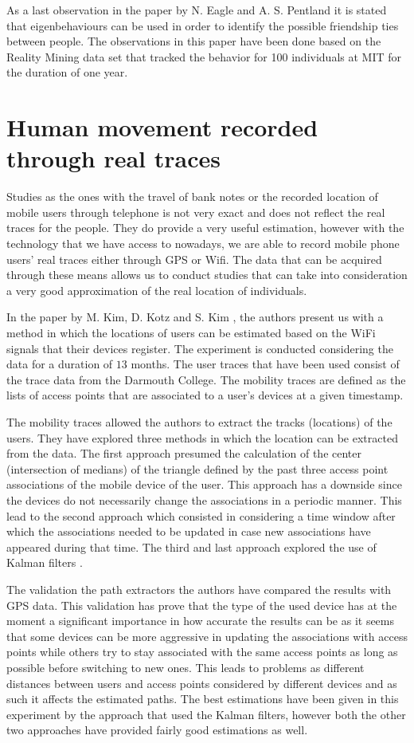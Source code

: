 As a last observation in the paper by N. Eagle and A. S. Pentland it is stated
that eigenbehaviours can be used in order to identify the possible friendship
ties between people. The observations in this paper have been done based on the
Reality Mining data set that tracked the behavior for 100 individuals at MIT for
the duration of one year.

\section{Human movement recorded through real traces}
Studies as the ones with the travel of bank notes or the recorded location of
mobile users through telephone is not very exact and does not reflect the real
traces for the people. They do provide a very useful estimation, however with
the technology that we have access to nowadays, we are able to record mobile
phone users' real traces either through GPS or Wifi. The data that can be
acquired through these means allows us to conduct studies that can take into
consideration a very good approximation of the real location of individuals.

In the paper by M. Kim, D. Kotz and S. Kim \cite{Kim06}, the authors present us
with a method in which the locations of users can be estimated based on the WiFi
signals that their devices register. The experiment is conducted considering
the data for a duration of $13$ months. The user traces that have been used consist
of the trace data from the Darmouth College. The mobility traces are defined as
the lists of access points that are associated to a user's devices at a given
timestamp.

The mobility traces allowed the authors to extract the tracks (locations) of the
users. They have explored three methods in which the location can be extracted
from the data. The first approach presumed the calculation of the center
(intersection of medians) of the triangle defined by the past three access
point associations of the mobile device of the user. This approach has a
downside since the devices do not necessarily change the associations in a
periodic manner. This lead to the second approach which consisted in considering
a time window after which the associations needed to be updated in case new
associations have appeared during that time. The third and last approach
explored the use of Kalman filters \cite{KalmanFilter}.

The validation the path extractors the authors have compared the results with
GPS data. This validation has prove that the type of the used device has at
the moment a significant importance in how accurate the results can be as it seems
that some devices can be more aggressive in updating the associations with
access points while others try to stay associated with the same access points as
long as possible before switching to new ones. This leads to problems as
different distances between users and access points considered by different
devices and as such it affects the estimated paths. The best estimations have
been given in this experiment by the approach that used the Kalman filters,
however both the other two approaches have provided fairly good estimations as
well.

